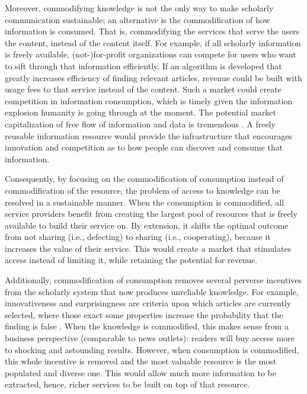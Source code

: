 \documentclass[]{tufte-book}
\begin{document}
Moreover, commodifying knowledge is not the only way to make scholarly
communication sustainable; an alternative is the commodification of how
information is consumed. That is, commodifying the services that serve
the users the content, instead of the content itself. For example, if
all scholarly information is freely available, (not-)for-profit
organizations can compete for users who want to sift through that
information efficiently. If an algorithm is developed that greatly
increases efficiency of finding relevant articles, revenue could be
built with usage fees to that service instead of the content. Such a
market could create competition in information consumption, which is
timely given the information explosion humanity is going through at the
moment. The potential market capitalization of free flow of information
and data is tremendous \citep[e.g., freely reusable public sector
information/data in the U.K. is estimated to provide a market cap of
£590 million - £16 billion; p.~96 of][]{dotecon}. A freely reusable
information resource would provide the infrastructure that encourages
innovation and competition as to how people can discover and consume
that information.

Consequently, by focusing on the commodification of consumption instead
of commodification of the resource, the problem of access to knowledge
can be resolved in a sustainable manner. When the consumption is
commodified, all service providers benefit from creating the largest
pool of resources that is freely available to build their service on. By
extension, it shifts the optimal outcome from not sharing (i.e.,
defecting) to sharing (i.e., cooperating), because it increases the
value of their service. This would create a market that stimulates
access instead of limiting it, while retaining the potential for
revenue.

Additionally, commodification of consumption removes several perverse
incentives from the scholarly system that now produces unreliable
knowledge. For example, innovativeness and surprisingness are criteria
upon which articles are currently selected, where those exact some
properties increase the probability that the finding is false
\citep{10.1371/journal.pmed.0020124}. When the knowledge is commodified,
this makes sense from a business perspective (comparable to news
outlets): readers will buy access more to shocking and astounding
results. However, when consumption is commodified, this whole incentive
is removed and the most valuable resource is the most populated and
diverse one. This would allow much more information to be extracted,
hence, richer services to be built on top of that resource.
\end{document}
